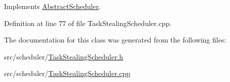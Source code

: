 Implements \hyperlink{class_abstract_scheduler_ab5f9142ccfc130e91fa6d92c7d3d7469}{Abstract\+Scheduler}.



Definition at line 77 of file Task\+Stealing\+Scheduler.\+cpp.



The documentation for this class was generated from the following files\+:\begin{DoxyCompactItemize}
\item 
src/scheduler/\hyperlink{_task_stealing_scheduler_8h}{Task\+Stealing\+Scheduler.\+h}\item 
src/scheduler/\hyperlink{_task_stealing_scheduler_8cpp}{Task\+Stealing\+Scheduler.\+cpp}\end{DoxyCompactItemize}
